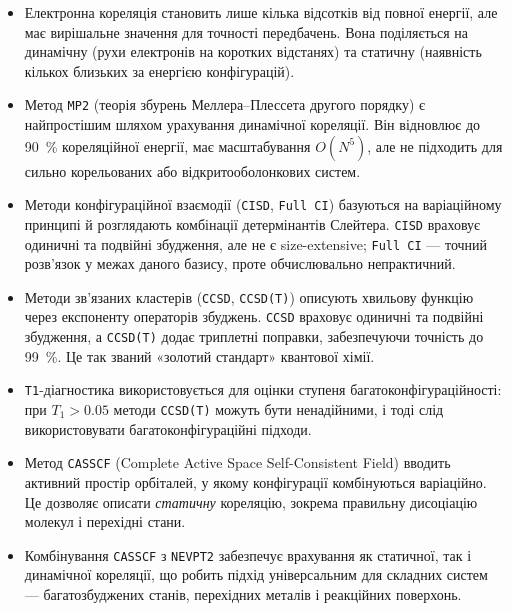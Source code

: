 \begin{itemize}
    \item Електронна кореляція становить лише кілька відсотків від повної енергії,
    але має вирішальне значення для точності передбачень.
    Вона поділяється на динамічну (рухи електронів на коротких відстанях)
    та статичну (наявність кількох близьких за енергією конфігурацій).

    \item Метод \texttt{MP2} (теорія збурень Меллера--Плессета другого порядку)
    є найпростішим шляхом урахування динамічної кореляції.
    Він відновлює до 90~\% кореляційної енергії, має масштабування $O(N^5)$,
    але не підходить для сильно корельованих або відкритооболонкових систем.

    \item Методи конфігураційної взаємодії (\texttt{CISD}, \texttt{Full CI})
    базуються на варіаційному принципі й розглядають комбінації детермінантів Слейтера.
    \texttt{CISD} враховує одиничні та подвійні збудження, але не є size-extensive;
    \texttt{Full CI} --- точний розв’язок у межах даного базису, проте обчислювально непрактичний.

    \item Методи зв’язаних кластерів (\texttt{CCSD}, \texttt{CCSD(T)})
    описують хвильову функцію через експоненту операторів збуджень.
    \texttt{CCSD} враховує одиничні та подвійні збудження,
    а \texttt{CCSD(T)} додає триплетні поправки, забезпечуючи точність до 99~\%.
    Це так званий «золотий стандарт» квантової хімії.

    \item \texttt{T1}-діагностика використовується для оцінки ступеня багатоконфігураційності:
    при $T_1 > 0.05$ методи \texttt{CCSD(T)} можуть бути ненадійними,
    і тоді слід використовувати багатоконфігураційні підходи.

    \item Метод \texttt{CASSCF} (Complete Active Space Self-Consistent Field)
    вводить активний простір орбіталей, у якому конфігурації комбінуються варіаційно.
    Це дозволяє описати \textit{статичну} кореляцію, зокрема правильну дисоціацію молекул і перехідні стани.

    \item Комбінування \texttt{CASSCF} з \texttt{NEVPT2} забезпечує врахування
    як статичної, так і динамічної кореляції, що робить підхід універсальним для складних систем
    --- багатозбуджених станів, перехідних металів і реакційних поверхонь.


\end{itemize}
